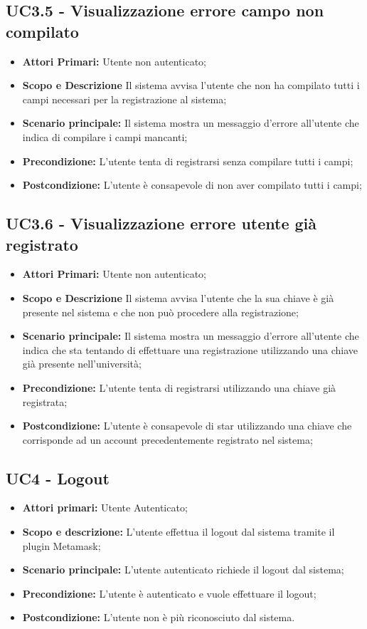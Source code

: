 \documentclass[AnalisiDeiRequisiti.tex]{subfiles}
\begin{document}
\subsection{UC3.5 - Visualizzazione errore campo non compilato}
\begin{itemize}
	\item \textbf{Attori Primari:} Utente non autenticato;
	\item \textbf{Scopo e Descrizione} Il sistema avvisa l'utente che non ha compilato tutti i campi necessari per la registrazione al sistema;
	\item \textbf{Scenario principale:} Il sistema mostra un messaggio d'errore all'utente che indica di compilare i campi mancanti;
	\item \textbf{Precondizione:} L'utente tenta di registrarsi senza compilare tutti i campi;
	\item \textbf{Postcondizione:} L'utente è consapevole di non aver compilato tutti i campi;
\end{itemize}
\subsection{UC3.6 - Visualizzazione errore utente già registrato}
\begin{itemize}
	\item \textbf{Attori Primari:} Utente non autenticato;
	\item \textbf{Scopo e Descrizione} Il sistema avvisa l'utente che la sua chiave è già presente nel sistema e che non può procedere alla registrazione;
	\item \textbf{Scenario principale:} Il sistema mostra un messaggio d'errore all'utente che indica che sta tentando di effettuare una registrazione utilizzando una chiave già presente nell'università;
	\item \textbf{Precondizione:} L'utente tenta di registrarsi utilizzando una chiave già registrata;
	\item \textbf{Postcondizione:} L'utente è consapevole di star utilizzando una chiave che corrisponde ad un account precedentemente registrato nel sistema;
\end{itemize}
\subsection{UC4 - Logout}
\begin{itemize}
	\item \textbf{Attori primari:} Utente Autenticato;
	\item \textbf{Scopo e descrizione:} L'utente effettua il logout dal sistema tramite il plugin Metamask;
	\item \textbf{Scenario principale:} L'utente autenticato richiede il logout dal sistema;
	\item \textbf{Precondizione:} L'utente è autenticato e vuole effettuare il logout;
	\item \textbf{Postcondizione:} L'utente non è più riconosciuto dal sistema.
\end{itemize}
\end{document}
